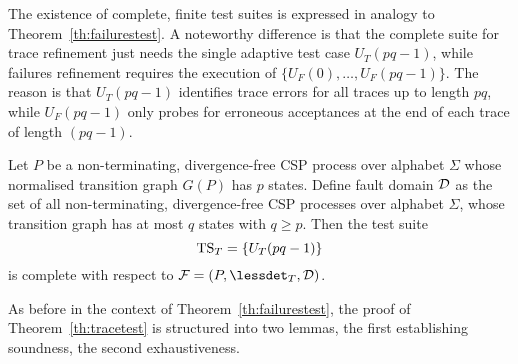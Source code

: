 The existence of complete, finite test suites is expressed in analogy to
Theorem~\ref{th:failurestest}. A noteworthy difference is that the complete
suite for trace refinement just needs the single adaptive test case
$U_T(pq-1)$, while failures refinement requires the execution of $\{
U_F(0),\dots,U_F(pq-1)\}$. The reason is that $U_T(pq-1)$ identifies trace
errors for all traces up to length $pq$, while $U_F(pq-1)$ only probes for
erroneous acceptances at the end of each trace of length $(pq -1)$.
%
\begin{theorem}\label{th:tracetest}
Let $P$ be a non-terminating, divergence-free CSP process over alphabet $\Sigma$ whose
normalised transition graph $G(P)$ has $p$ states. Define fault domain ${\cal
D}$ as the set of all non-terminating, divergence-free CSP processes over alphabet $\Sigma$,
whose transition graph has at most $q$ states with $q \ge p$. Then the test
suite
\[
{\text{TS}}_T = \{ U_T(pq-1)   \}
\]
is complete with respect to ${\cal F} = (P,\lessdet_T,{\cal D})$.
\xbox
\end{theorem}
%
As before in the context of Theorem~\ref{th:failurestest},
the proof of Theorem~\ref{th:tracetest} is structured into two lemmas, the first
establishing soundness, the second exhaustiveness.

